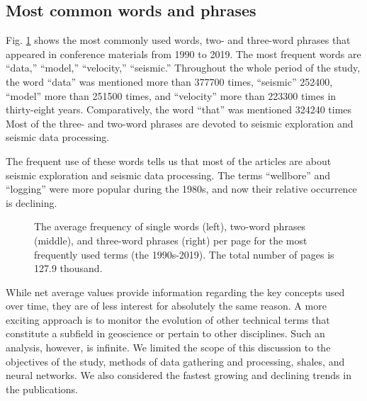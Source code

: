 \documentclass[geosciences,article,submit,moreauthors,pdftex]{Definitions/mdpi}
\begin{document}
\subsection{Most common words and phrases}

Fig. \ref{grams} shows the most commonly used words, two- and three-word phrases that appeared in conference materials from 1990 to 2019. The most frequent words are ``data,'' ``model,'' ``velocity,'' ``seismic.'' Throughout the whole period of the study, the word ``data'' was mentioned more than 377700 times, ``seismic'' 252400, ``model'' more than 251500 times, and ``velocity'' more than 223300 times in thirty-eight years. Comparatively, the word ``that'' was mentioned 324240 times Most of the three- and two-word phrases are devoted to seismic exploration and seismic data processing. 

The frequent use of these words tells us that most of the articles are about seismic exploration and seismic data processing. The terms ``wellbore'' and ``logging'' were more popular during the 1980s, and now their relative occurrence is declining. 

\begin{figure}[ht!]
\caption{The average frequency of single words (left), two-word phrases (middle), and three-word phrases (right) per page for the most frequently used terms (the 1990s-2019). The total number of pages is 127.9 thousand.}
\label{grams}
\end{figure}

While net average values provide information regarding the key concepts used over time, they are of less interest for absolutely the same reason. A more exciting approach is to monitor the evolution of other technical terms that constitute a subfield in geoscience or pertain to other disciplines. Such an analysis, however, is infinite. We limited the scope of this discussion to the objectives of the study, methods of data gathering and processing, shales, and neural networks. We also considered the fastest growing and declining trends in the publications.
\end{document}
